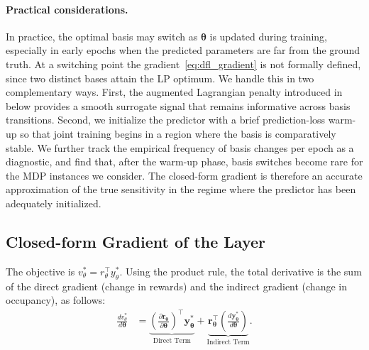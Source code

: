 \paragraph{Practical considerations.}
In practice, the optimal basis may switch as $\bm{\theta}$ is updated during training, especially in early epochs when the predicted parameters are far from the ground truth. At a switching point the gradient~\eqref{eq:dfl_gradient} is not formally defined, since two distinct bases attain the LP optimum. We handle this in two complementary ways. First, the augmented Lagrangian penalty introduced in~ below provides a smooth surrogate signal that remains informative across basis transitions. Second, we initialize the predictor with a brief prediction-loss warm-up so that joint training begins in a region where the basis is comparatively stable. We further track the empirical frequency of basis changes per epoch as a diagnostic, and find that, after the warm-up phase, basis switches become rare for the MDP instances we consider. The closed-form gradient is therefore an accurate approximation of the true sensitivity in the regime where the predictor has been adequately initialized.

\subsection{Closed-form Gradient of the \LP Layer}

The \LP objective is $v^*_\theta = r_\theta^\top y^*_\theta$. 
Using the product rule, the total derivative is the sum of the direct gradient (change in rewards) and the indirect gradient (change in occupancy), as follows:
\begin{align}
    \frac{d v_{\theta}^*}{d\bm{\theta}}
    & =
    \underbrace{\left( \frac{\partial \bm{r}_{\bm{\theta}}}{\partial \bm{\theta}} \right)^\top 
    \bm{y}_{\bm{\theta}}^*}_{\text{Direct Term}}
    +
    \underbrace{\bm{r}_{\bm{\theta}}^\top 
    \left( \frac{d \bm{y}_{\bm{\theta}}^*}{d \bm{\theta}} \right)}_{\text{Indirect Term}}.
    \label{eq:lp_grad}
\end{align}

